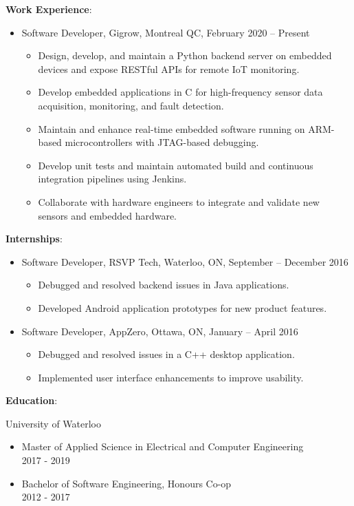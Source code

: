 \documentclass[letterpaper]{article}
\begin{document}
\vspace{1em}

\begin{large}
\textbf{Work Experience}:
\end{large}
\begin{itemize}[leftmargin=5.5mm]
\item Software Developer, Gigrow, Montreal QC, February 2020 – Present
	\begin{itemize} 
	\item Design, develop, and maintain a Python backend server on embedded devices and expose RESTful APIs for remote IoT monitoring.
	\item Develop embedded applications in C for high-frequency sensor data acquisition, monitoring, and fault detection.
	\item Maintain and enhance real-time embedded software running on ARM-based microcontrollers with JTAG-based debugging.
	\item Develop unit tests and maintain automated build and continuous integration pipelines using Jenkins.
	\item Collaborate with hardware engineers to integrate and validate new sensors and embedded hardware.
	\end{itemize}
\end{itemize}

\begin{large}
\textbf{Internships}:
\end{large}
\begin{itemize}[leftmargin=5.5mm]
\item Software Developer, RSVP Tech, Waterloo, ON, September – December 2016
	\begin{itemize}
	\item Debugged and resolved backend issues in Java applications.
	\item Developed Android application prototypes for new product features.
	\end{itemize}
\item Software Developer, AppZero, Ottawa, ON, January – April 2016
	\begin{itemize}
	\item Debugged and resolved issues in a C++ desktop application.
	\item Implemented user interface enhancements to improve usability.
	\end{itemize}

\end{itemize}


\vspace{1em}

\begin{large}
\textbf{Education}:\\
\end{large}
University of Waterloo
\begin{itemize}[leftmargin=5.5mm]
\item Master of Applied Science in Electrical and Computer Engineering \\
2017 - 2019
\item Bachelor of Software Engineering, Honours Co-op\\
2012 - 2017
\end{itemize}
\end{document}
